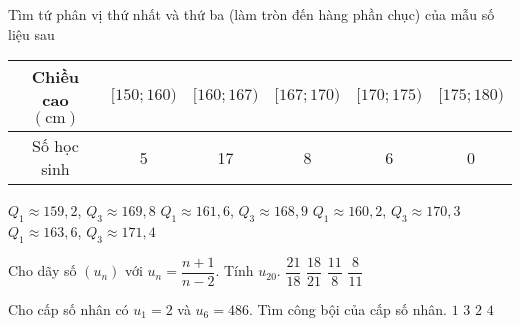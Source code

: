 \begin{ex}%
	Tìm tứ phân vị thứ nhất và thứ ba (làm tròn đến hàng phần chục) của mẫu số liệu sau 
	\begin{center}
		\begin{tabular}{|c|c|c|c|c|c|}
			\hline Chiều cao $(\mathrm{cm})$ & {$[150 ; 160)$} & {$[160 ; 167)$} & {$[167 ; 170)$} & {$[170 ; 175)$} & {$[175 ; 180)$} \\
			\hline Số học sinh &5& 17 & 8 & 6 & 0 \\
			\hline
		\end{tabular}
	\end{center}
	\choice
	{$Q_1 \approx 159{,}2$, $Q_3 \approx 169{,}8$}
	{\True $Q_1 \approx 161{,}6$, $Q_3 \approx 168{,}9$}
	{$Q_1 \approx 160{,}2$, $Q_3 \approx 170{,}3$}
	{$Q_1 \approx 163{,}6$, $Q_3 \approx 171{,}4$}
\end{ex}
\begin{ex}%
	Cho dãy số $(u_n)$ với $u_n=\dfrac{n+1}{n-2}$. Tính $u_{20}$.
	\choice
	{\True $\dfrac{21}{18}$}
	{$\dfrac{18}{21}$}
	{$\dfrac{11}{8}$}
	{$\dfrac{8}{11}$}
\end{ex}
\begin{ex}%
	Cho cấp số nhân có $u_1=2$ và $u_6=486$. Tìm công bội của cấp số nhân.
	\choice
	{$1$}
	{\True $3$}
	{$2$}
	{$4$}
\end{ex}

